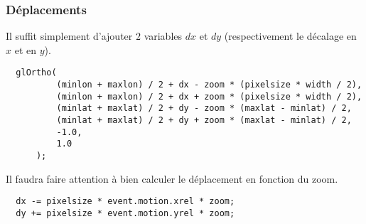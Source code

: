 \subsubsection{Déplacements}

Il suffit simplement d'ajouter $2$ variables $dx$ et $dy$ (respectivement le décalage en $x$ et en $y$).

\begin{lstlisting}
  glOrtho(
          (minlon + maxlon) / 2 + dx - zoom * (pixelsize * width / 2),
          (minlon + maxlon) / 2 + dx + zoom * (pixelsize * width / 2),
          (minlat + maxlat) / 2 + dy - zoom * (maxlat - minlat) / 2,
          (minlat + maxlat) / 2 + dy + zoom * (maxlat - minlat) / 2,
          -1.0,
          1.0
      );
\end{lstlisting}

Il faudra faire attention à bien calculer le déplacement en fonction du zoom.

\begin{lstlisting}
  dx -= pixelsize * event.motion.xrel * zoom;
  dy += pixelsize * event.motion.yrel * zoom;
\end{lstlisting}
